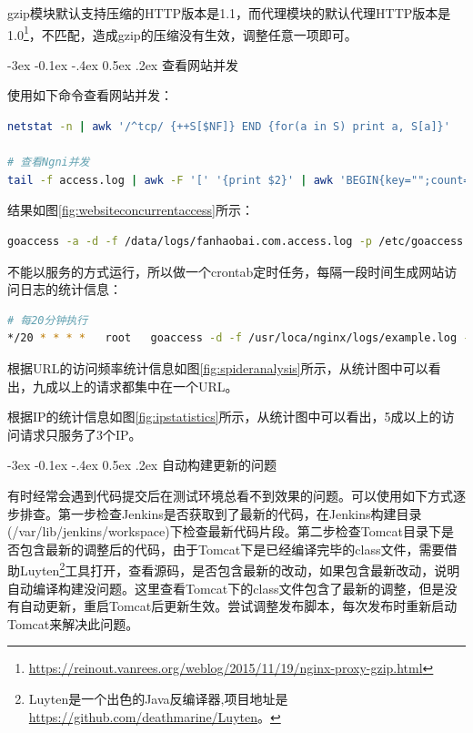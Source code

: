 \documentclass[8pt]{book}
\makeatletter
\numberwithin{dummy}{section}
\theoremstyle{ocrenumbox}
\theoremstyle{blacknumex}
\theoremstyle{blacknumbox}
\theoremstyle{ocrenum}
\renewcommand{\subsection}{\@startsection {subsection}{2}{\z@}
	{-3ex \@plus -0.1ex \@minus -.4ex}
	{0.5ex \@plus.2ex }
	{\normalfont\sffamily\bfseries}}
\makeatother
\begin{document}
gzip模块默认支持压缩的HTTP版本是1.1，而代理模块的默认代理HTTP版本是1.0\footnote{\url{https://reinout.vanrees.org/weblog/2015/11/19/nginx-proxy-gzip.html}}，不匹配，造成gzip的压缩没有生效，调整任意一项即可。

\subsection{查看网站并发}

使用如下命令查看网站并发：

\begin{lstlisting}[language=Bash]
netstat -n | awk '/^tcp/ {++S[$NF]} END {for(a in S) print a, S[a]}'

# 查看Ngni并发
tail -f access.log | awk -F '[' '{print $2}' | awk 'BEGIN{key="";count=0}{if(key==$1){count++}else{printf("%s\t%d\r\n", key, count);count=1;key=$1}}'
\end{lstlisting}

结果如图\ref{fig:websiteconcurrentaccess}所示：



\begin{lstlisting}[language=Bash]
goaccess -a -d -f /data/logs/fanhaobai.com.access.log -p /etc/goaccess.conf -o /data/html/hexo/public/go-access.html
\end{lstlisting}

不能以服务的方式运行，所以做一个crontab定时任务，每隔一段时间生成网站访问日志的统计信息：

\begin{lstlisting}[language=Bash]
# 每20分钟执行
*/20 * * * *   root   goaccess -d -f /usr/loca/nginx/logs/example.log -p /usr/local/etc/goaccess.conf
\end{lstlisting}

根据URL的访问频率统计信息如图\ref{fig:spideranalysis}所示，从统计图中可以看出，九成以上的请求都集中在一个URL。



根据IP的统计信息如图\ref{fig:ipstatistics}所示，从统计图中可以看出，5成以上的访问请求只服务了3个IP。



\subsection{自动构建更新的问题}

有时经常会遇到代码提交后在测试环境总看不到效果的问题。可以使用如下方式逐步排查。第一步检查Jenkins是否获取到了最新的代码，在Jenkins构建目录(/var/lib/jenkins/workspace)下检查最新代码片段。第二步检查Tomcat目录下是否包含最新的调整后的代码，由于Tomcat下是已经编译完毕的class文件，需要借助Luyten\footnote{Luyten是一个出色的Java反编译器,项目地址是\url{https://github.com/deathmarine/Luyten}。}工具打开，查看源码，是否包含最新的改动，如果包含最新改动，说明自动编译构建没问题。这里查看Tomcat下的class文件包含了最新的调整，但是没有自动更新，重启Tomcat后更新生效。尝试调整发布脚本，每次发布时重新启动Tomcat来解决此问题。
\end{document}
